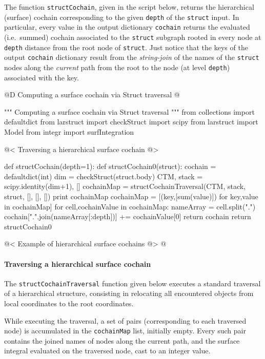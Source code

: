 \documentclass[11pt,oneside]{article}    %
\begin{document}
The function \texttt{structCochain}, given in the script below, returns the hierarchical (surface) cochain corresponding to the given \texttt{depth} of the \texttt{struct} input. In particular, every value in the output dictionary \texttt{cochain} returns the evaluated (i.e.~summed) cochain associated to the \texttt{struct} subgraph rooted in every node at  \texttt{depth} distance from the root node of \texttt{struct}. Just notice that the keys of the output \texttt{cochain} dictionary result from the \emph{string-join} of the names of the \texttt{struct} nodes along the \emph{current} path from the root to the node (at level \texttt{depth}) associated with the key.

@D Computing a surface cochain via Struct traversal
@{""" Computing a surface cochain via Struct traversal """
from collections import defaultdict
from larstruct import checkStruct
import scipy
from larstruct import Model
from integr import surfIntegration

@< Traversing a hierarchical surface cochain @>

def structCochain(depth=1):
    def structCochain0(struct):
        cochain = defaultdict(int)
        dim = checkStruct(struct.body)
        CTM, stack = scipy.identity(dim+1), []
        cochainMap = structCochainTraversal(CTM, stack, struct, [], [], []) 
        print cochainMap
        cochainMap = [(key,[sum(value)]) for key,value in cochainMap]
        for cell,cochainValue in cochainMap:
            nameArray = cell.split(".")
            cochain[".".join(nameArray[:depth])] += cochainValue[0]
        return cochain
    return structCochain0
    
@< Example of hierarchical surface cochains @>
@}

\paragraph{Traversing a hierarchical surface cochain}
The \texttt{structCochainTraversal} function given below executes a standard traversal of a hierarchical structure, consisting in relocating all encountered objects from local coordinates to the root coordinates. 

While executing the traversal, a set of pairs (corresponding to each traversed node) is accumulated in the \texttt{cochainMap} list, initially empty. Every such pair contains the joined names of nodes along the current path, and the surface integral evaluated on the traversed node, cast to an integer value. 
\end{document}

